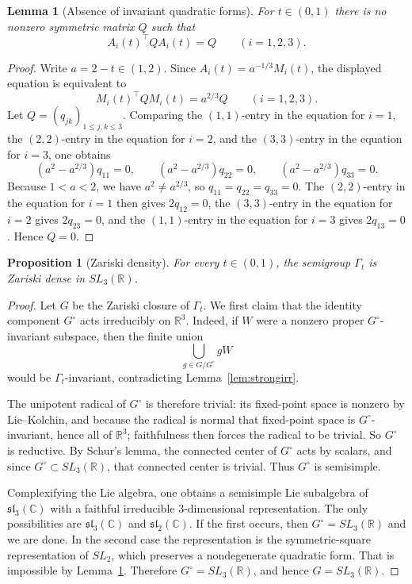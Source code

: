 \documentclass[11pt]{amsart}
\newtheorem{proposition}[proposition]{Proposition}
\newtheorem{lemma}[lemma]{Lemma}
\theoremstyle{definition}
\newcommand{\R}{\mathbb{R}}
\newcommand{\C}{\mathbb{C}}
\begin{document}
\begin{lemma}[Absence of invariant quadratic forms]\label{lem:noquad}
For $t\in(0,1)$ there is no nonzero symmetric matrix $Q$ such that
\[
A_i(t)^\top Q A_i(t)=Q \qquad (i=1,2,3).
\]
\end{lemma}

\begin{proof}
Write $a=2-t\in(1,2)$. Since $A_i(t)=a^{-1/3}M_i(t)$, the displayed equation is equivalent to
\[
M_i(t)^\top Q M_i(t)=a^{2/3}Q \qquad (i=1,2,3).
\]
Let $Q=(q_{jk})_{1\le j,k\le 3}$. Comparing the $(1,1)$-entry in the equation for $i=1$, the $(2,2)$-entry in the equation for $i=2$, and the $(3,3)$-entry in the equation for $i=3$, one obtains
\[
(a^2-a^{2/3})q_{11}=0,\qquad
(a^2-a^{2/3})q_{22}=0,\qquad
(a^2-a^{2/3})q_{33}=0.
\]
Because $1<a<2$, we have $a^2\neq a^{2/3}$, so $q_{11}=q_{22}=q_{33}=0$. The $(2,2)$-entry in the equation for $i=1$ then gives $2q_{12}=0$, the $(3,3)$-entry in the equation for $i=2$ gives $2q_{23}=0$, and the $(1,1)$-entry in the equation for $i=3$ gives $2q_{13}=0$. Hence $Q=0$.
\end{proof}

\begin{proposition}[Zariski density]\label{prop:zariski}
For every $t\in(0,1)$, the semigroup $\Gamma_t$ is Zariski dense in $SL_3(\R)$.
\end{proposition}

\begin{proof}
Let $G$ be the Zariski closure of $\Gamma_t$. We first claim that the identity component $G^\circ$ acts irreducibly on $\R^3$. Indeed, if $W$ were a nonzero proper $G^\circ$-invariant subspace, then the finite union
\[
\bigcup_{g\in G/G^\circ} gW
\]
would be $\Gamma_t$-invariant, contradicting Lemma~\ref{lem:strongirr}.

The unipotent radical of $G^\circ$ is therefore trivial: its fixed-point space is nonzero by Lie--Kolchin, and because the radical is normal that fixed-point space is $G^\circ$-invariant, hence all of $\R^3$; faithfulness then forces the radical to be trivial. So $G^\circ$ is reductive. By Schur's lemma, the connected center of $G^\circ$ acts by scalars, and since $G^\circ\subset SL_3(\R)$, that connected center is trivial. Thus $G^\circ$ is semisimple.

Complexifying the Lie algebra, one obtains a semisimple Lie subalgebra of $\mathfrak{sl}_3(\C)$ with a faithful irreducible $3$-dimensional representation. The only possibilities are $\mathfrak{sl}_3(\C)$ and $\mathfrak{sl}_2(\C)$. If the first occurs, then $G^\circ=SL_3(\R)$ and we are done. In the second case the representation is the symmetric-square representation of $SL_2$, which preserves a nondegenerate quadratic form. That is impossible by Lemma~\ref{lem:noquad}. Therefore $G^\circ=SL_3(\R)$, and hence $G=SL_3(\R)$.
\end{proof}
\end{document}

